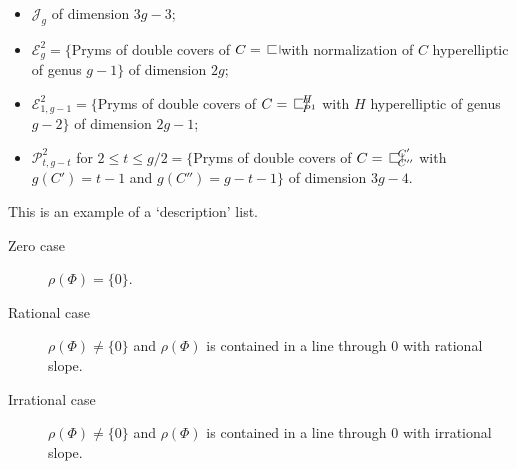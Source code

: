 \documentclass{amsart}
\theoremstyle{definition}
\theoremstyle{remark}
\numberwithin{equation}{section}
\begin{document}
\begin{itemize}
\item $\mathcal{J}_g$ of dimension $3g-3$;
\item $\mathcal{E}^2_g=\{$Pryms of double covers of $C=\openbox$ with
normalization of $C$ hyperelliptic of genus $g-1\}$ of dimension $2g$;
\item $\mathcal{E}^2_{1,g-1}=\{$Pryms of double covers of
$C=\openbox^H_{P^1}$ with $H$ hyperelliptic of genus $g-2\}$ of
dimension $2g-1$;
\item $\mathcal{P}^2_{t,g-t}$ for $2\le t\le g/2=\{$Pryms of double
covers of $C=\openbox^{C'}_{C''}$ with $g(C')=t-1$ and $g(C'')=g-t-1\}$
of dimension $3g-4$.
\end{itemize}

This is an example of a `description' list.

\begin{description}
\item[Zero case] $\rho(\Phi) = \{0\}$.

\item[Rational case] $\rho(\Phi) \ne \{0\}$ and $\rho(\Phi)$ is
contained in a line through $0$ with rational slope.

\item[Irrational case] $\rho(\Phi) \ne \{0\}$ and $\rho(\Phi)$ is
contained in a line through $0$ with irrational slope.
\end{description}



\end{document}
